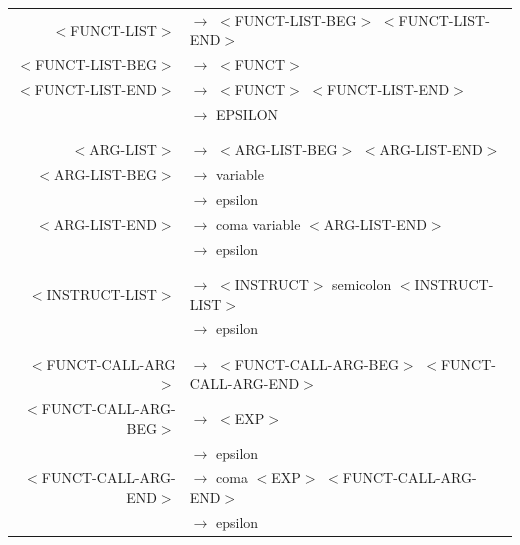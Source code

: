 \documentclass[a4paper,10pt]{article}
\begin{document}
	\begin{center}\begin{tabular}{rl}				
					
		$<$FUNCT-LIST$>$		& $\rightarrow$ $<$FUNCT-LIST-BEG$>$ $<$FUNCT-LIST-END$>$\\
		$<$FUNCT-LIST-BEG$>$	& $\rightarrow$ $<$FUNCT$>$ \\
		$<$FUNCT-LIST-END$>$	& $\rightarrow$ $<$FUNCT$>$ $<$FUNCT-LIST-END$>$\\
								& $\rightarrow$ EPSILON \\
								&\\
								&\\

		$<$ARG-LIST$>$			& $\rightarrow$ $<$ARG-LIST-BEG$>$ $<$ARG-LIST-END$>$\\ 
		$<$ARG-LIST-BEG$>$		& $\rightarrow$ variable\\ 
								& $\rightarrow$ epsilon \\
		$<$ARG-LIST-END$>$		& $\rightarrow$ coma variable $<$ARG-LIST-END$>$\\ 
								& $\rightarrow$ epsilon \\
								&\\
								&\\
		$<$INSTRUCT-LIST$>$		& $\rightarrow$ $<$INSTRUCT$>$ semicolon $<$INSTRUCT-LIST$>$\\
								& $\rightarrow$ epsilon\\
								&\\
								&\\

		$<$FUNCT-CALL-ARG$>$	& $\rightarrow$ $<$FUNCT-CALL-ARG-BEG$>$ $<$FUNCT-CALL-ARG-END$>$\\ 
		$<$FUNCT-CALL-ARG-BEG$>$& $\rightarrow$ $<$EXP$>$\\ 
								& $\rightarrow$ epsilon \\
		$<$FUNCT-CALL-ARG-END$>$& $\rightarrow$ coma $<$EXP$>$ $<$FUNCT-CALL-ARG-END$>$\\ 
								& $\rightarrow$ epsilon \\
	\end{tabular}\end{center}
\end{document}
